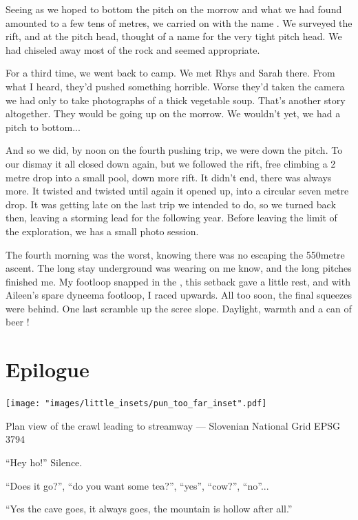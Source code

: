 Seeing as we hoped to bottom the pitch on the morrow and what we had found amounted to a few tens of metres, we carried on with the name . We surveyed the rift, and at the pitch head, thought of a name for the very tight pitch head. We had chiseled away most of the rock and  seemed appropriate.

For a third time, we went back to camp. We met Rhys and Sarah there. From what I heard, they'd pushed something horrible. Worse they'd taken the camera we had only to take photographs of a thick vegetable soup. That's another story altogether. They would be going up on the morrow. We wouldn't yet, we had a pitch to bottom...

And so we did, by noon on the fourth pushing trip, we were down the pitch. To our dismay it all closed down again, but we followed the rift, free climbing a 2 metre drop into a small pool, down more rift. It didn't end, there was always more. It twisted and twisted until again it opened up, into a circular seven metre drop. It was getting late on the last trip we intended to do, so we turned back then, leaving a storming lead for the following year. Before leaving the limit of the exploration, we has a small photo session.

The fourth morning was the worst, knowing there was no escaping the 550metre ascent. The long stay underground was wearing on me know, and the long pitches finished me. My footloop snapped in the , this setback gave a little rest, and with Aileen's spare dyneema footloop, I raced upwards. All too soon, the final squeezes were behind. One last scramble up the scree slope. Daylight, warmth and a can of beer !

\section{Epilogue}


\begin{marginsurvey}
	\texttt{[image: "images/little\_insets/pun\_too\_far\_inset".pdf]}
	\caption{Plan view of the \protect{} crawl leading to  \protect{} streamway --- Slovenian National Grid EPSG 3794}
\end{marginsurvey}

``Hey ho!'' Silence. 

``Does it go?'', ``do you want some tea?'', ``yes'', ``cow?'', ``no''...

``Yes the cave goes, it always goes, the mountain is hollow after all.''

